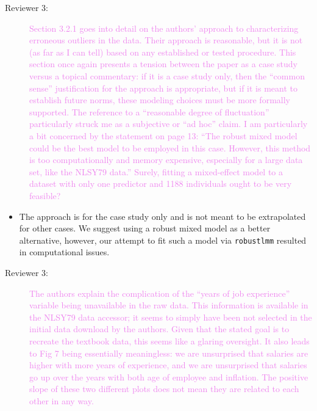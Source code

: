 \documentclass[12pt,a4paper,]{article}
\providecommand{\tightlist}{%
  \setlength{\itemsep}{0pt}\setlength{\parskip}{0pt}}
\begin{document}
\begin{description}
\item[Reviewer 3:] \textcolor{violet}{
Section 3.2.1 goes into detail on the authors’ approach to characterizing erroneous outliers in
the data. Their approach is reasonable, but it is not (as far as I can tell) based on any
established or tested procedure. This section once again presents a tension between the paper
as a case study versus a topical commentary: if it is a case study only, then the “common sense”
justification for the approach is appropriate, but if it is meant to establish future norms, these
modeling choices must be more formally supported. The reference to a “reasonable degree of
fluctuation” particularly struck me as a subjective or “ad hoc” claim. I am particularly a bit concerned by the statement on page 13: “The robust mixed model could
be the best model to be employed in this case. However, this method is too computationally
and memory expensive, especially for a large data set, like the NLSY79 data.” Surely, fitting a 
mixed-effect model to a dataset with only one predictor and 1188 individuals ought to be very
feasible?
}
\end{description}

\begin{itemize}
\tightlist
\item
  The approach is for the case study only and is not meant to be extrapolated for other cases. We suggest using a robust mixed model as a better alternative, however, our attempt to fit such a model via \texttt{robustlmm} resulted in computational issues.
\end{itemize}

\begin{description}
\item[Reviewer 3:]\textcolor{violet}{The authors explain the complication of the “years of job experience” variable being unavailable in the raw data. This information is available in the NLSY79 data accessor; it seems to simply have been not selected in the initial data download by the authors.
Given that the stated goal is to recreate the textbook data, this seems like a glaring oversight.
It also leads to Fig 7 being essentially meaningless: we are unsurprised that salaries are higher with more years of experience, and we are unsurprised that salaries go up over the years with both age of employee and inflation. The positive slope of these two different plots does not mean they are related to each other in any way.}
\end{description}
\end{document}
